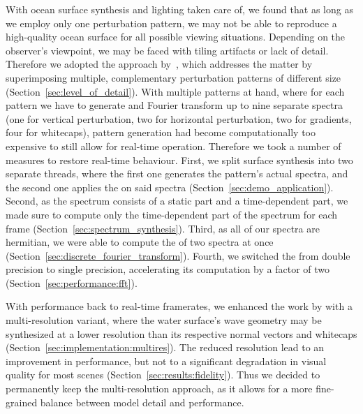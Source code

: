 With ocean surface synthesis and lighting taken care of, we found that
as long as we employ only one perturbation pattern, we may not
be able to reproduce a high-quality ocean surface for all possible
viewing situations. Depending on the observer's viewpoint, we may be
faced with tiling artifacts or lack of detail.
Therefore we adopted the approach by~\citet{misc:oceanlightingfft},
which addresses the matter by superimposing multiple, complementary perturbation
patterns of different size (Section~\ref{sec:level_of_detail}).
With multiple patterns at hand, where for each pattern we have to
generate and Fourier transform up to nine separate spectra (one for vertical
perturbation, two for horizontal perturbation, two for gradients,
four for whitecaps), pattern generation had become computationally too
expensive to still allow for real-time operation.
Therefore we took a number of measures to restore real-time behaviour.
First, we split surface synthesis into two separate threads, where the first
one generates the pattern's actual spectra, and the second one
applies the \InvDiscreteFourierTransform on said spectra (Section~\ref{sec:demo_application}).
Second, as the spectrum consists of a static part and a time-dependent part,
we made sure to compute only the time-dependent part of the spectrum for each
frame (Section~\ref{sec:spectrum_synthesis}).
Third, as all of our spectra are hermitian, we were able to compute the
\InvFourierTransform of two spectra at once (Section~\ref{sec:discrete_fourier_transform}).
Fourth, we switched the \InvFourierTransform from double precision to single
precision, accelerating its computation by a factor of two
(Section~\ref{sec:performance:fft}).

With performance back to real-time framerates, we enhanced the work by
\citet{misc:oceanlightingfft} with a multi-resolution variant, where
the water surface's wave geometry may be synthesized at a lower resolution
than its respective normal vectors and whitecaps
(Section~\ref{sec:implementation:multires}).
The reduced resolution lead to an improvement in performance, but not to a
significant degradation in visual quality for most scenes (Section~\ref{sec:results:fidelity}).
Thus we decided to permanently keep the multi-resolution approach, as it
allows for a more fine-grained balance between model detail and performance.
%

